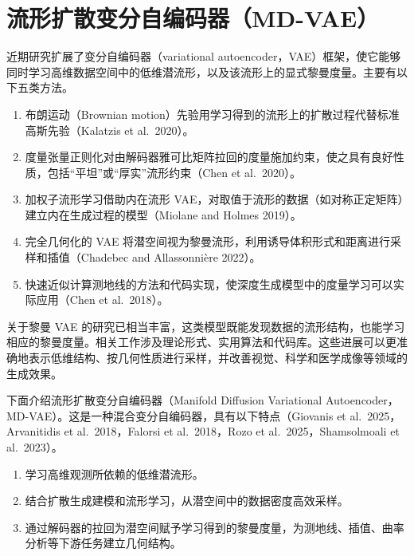 \section{流形扩散变分自编码器（MD-VAE）}

近期研究扩展了变分自编码器（variational autoencoder，VAE）框架，使它能够同时学习高维数据空间中的低维潜流形，以及该流形上的显式黎曼度量。主要有以下五类方法。
\begin{enumerate}
  \item 布朗运动（Brownian motion）先验用学习得到的流形上的扩散过程代替标准高斯先验（Kalatzis et al.\ 2020）。
  \item 度量张量正则化对由解码器雅可比矩阵拉回的度量施加约束，使之具有良好性质，包括“平坦”或“厚实”流形约束（Chen et al.\ 2020）。
  \item 加权子流形学习借助内在流形 VAE，对取值于流形的数据（如对称正定矩阵）建立内在生成过程的模型（Miolane and Holmes 2019）。
  \item 完全几何化的 VAE 将潜空间视为黎曼流形，利用诱导体积形式和距离进行采样和插值（Chadebec and Allassonnière 2022）。
  \item 快速近似计算测地线的方法和代码实现，使深度生成模型中的度量学习可以实际应用（Chen et al.\ 2018）。
\end{enumerate}

关于黎曼 VAE 的研究已相当丰富，这类模型既能发现数据的流形结构，也能学习相应的黎曼度量。相关工作涉及理论形式、实用算法和代码库。这些进展可以更准确地表示低维结构、按几何性质进行采样，并改善视觉、科学和医学成像等领域的生成效果。

下面介绍流形扩散变分自编码器（Manifold Diffusion Variational Autoencoder，MD-VAE）。这是一种混合变分自编码器，具有以下特点（Giovanis et al.\ 2025，Arvanitidis et al.\ 2018，Falorsi et al.\ 2018，Rozo et al.\ 2025，Shamsolmoali et al.\ 2023）。
\begin{enumerate}
  \item 学习高维观测所依赖的低维潜流形。
  \item 结合扩散生成建模和流形学习，从潜空间中的数据密度高效采样。
  \item 通过解码器的拉回为潜空间赋予学习得到的黎曼度量，为测地线、插值、曲率分析等下游任务建立几何结构。
\end{enumerate}

\begin{figure}[htbp]
  \centering
  
\end{figure}

